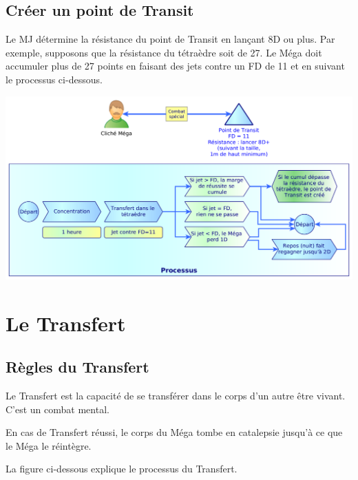 \documentclass[11pt]{article}
\begin{document}
\subsection{Créer un point de Transit}

Le MJ détermine la résistance du point de Transit en lançant 8D ou plus. Par exemple, supposons que la résistance du tétraèdre soit de 27. Le Méga doit accumuler plus de 27 points en faisant des jets contre un FD de 11 et en suivant le processus ci-dessous.


\begin{center}
\includegraphics[scale=0.28]{05-point-transit}
\end{center}



\newpage
\section{Le Transfert}

\subsection{Règles du Transfert}

Le Transfert est la capacité de se transférer dans le corps d'un autre être vivant. C'est un combat mental.

En cas de Transfert réussi, le corps du Méga tombe en catalepsie jusqu'à ce que le Méga le réintègre.

La figure ci-dessous explique le processus du Transfert.
\end{document}

